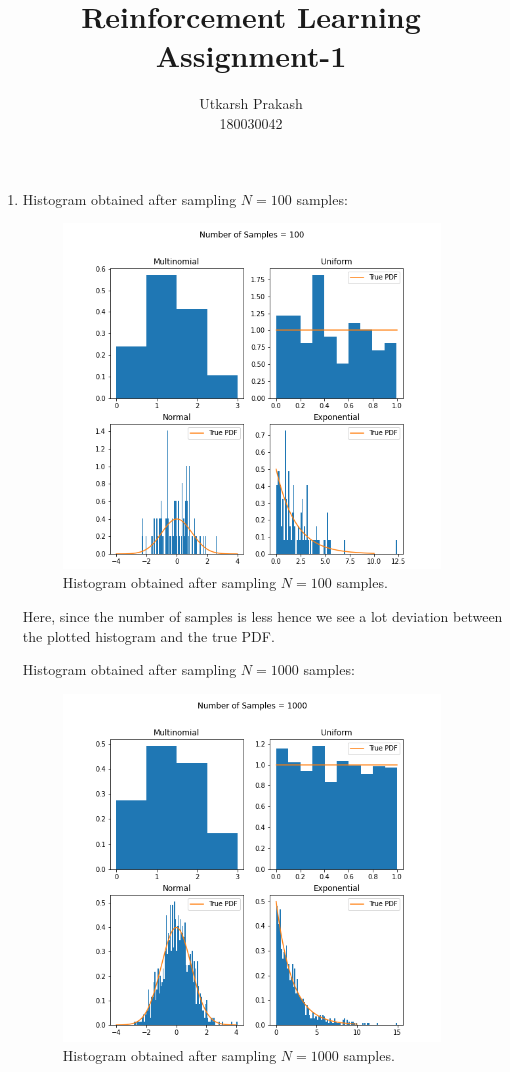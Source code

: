 \documentclass{article}
\title{Reinforcement Learning Assignment-1}
\begin{document}
\author{Utkarsh Prakash \\ \normalsize 180030042}
\maketitle
\begin{enumerate}
    \item Histogram obtained after sampling $N=100$ samples:
        \begin{figure}[H]
            \begin{center}
            \includegraphics[width=10cm]{Q1_100.png}
            \end{center}
            \caption{Histogram obtained after sampling $N=100$ samples.}
        \end{figure}
        Here, since the number of samples is less hence we see a lot deviation between the plotted histogram and the true PDF.\par
	
	    \noindent %
        Histogram obtained after sampling $N=1000$ samples:
        \begin{figure}[H]
            \begin{center}
            \includegraphics[width=10cm]{Q1_1000.png}
            \end{center}
            \caption{Histogram obtained after sampling $N=1000$ samples.}
        \end{figure}


\end{enumerate}
\end{document}
